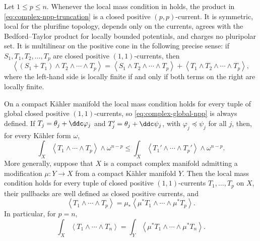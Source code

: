 \begin{theorem}\label{thm:complex-npp-ledger}
Let $1\leq p\leq n$.  Whenever the local mass condition in
 holds, the product in
\eqref{eq:complex-npp-truncation} is a closed positive $(p,p)$-current.
It is symmetric, local for the plurifine topology, depends only on the
currents, agrees with the Bedford--Taylor product for locally bounded
potentials, and charges no pluripolar set.  It is multilinear on the positive
cone in the following precise sense: if $S_1,T_1,T_2,\ldots,T_p$ are
closed positive $(1,1)$-currents, then
\[
 \left\langle (S_1+T_1)\wedge T_2\wedge\cdots\wedge T_p\right\rangle
 =\left\langle S_1\wedge T_2\wedge\cdots\wedge T_p\right\rangle
  +\left\langle T_1\wedge T_2\wedge\cdots\wedge T_p\right\rangle,
\]
where the left-hand side is locally finite if and only if both terms on the
right are locally finite.

On a compact K\"ahler manifold the local mass condition holds for every
tuple of global closed positive $(1,1)$-currents, so
\eqref{eq:complex-global-npp} is always defined.  If
$T_j=\theta_j+\ddc\varphi_j$ and
$T_j'=\theta_j+\ddc\psi_j$, with
$\varphi_j\preceq\psi_j$ for all $j$, then, for every K\"ahler form
$\omega$,
\[
 \int_X\left\langle T_1\wedge\cdots\wedge T_p\right\rangle
              \wedge\omega^{n-p}
 \leq
 \int_X\left\langle T_1'\wedge\cdots\wedge T_p'\right\rangle
              \wedge\omega^{n-p}.
\]
More generally, suppose that $X$ is a compact complex manifold admitting
a modification $\mu:Y\to X$ from a compact K\"ahler manifold $Y$.
Then the local mass condition holds for every tuple of closed positive
$(1,1)$-currents $T_1,\ldots,T_p$ on $X$, their pullbacks are
well defined as closed positive currents, and
\[
 \left\langle T_1\wedge\cdots\wedge T_p\right\rangle
 =\mu_*\left\langle
       \mu^*T_1\wedge\cdots\wedge\mu^*T_p\right\rangle .
\tag{51.16a}\label{eq:complex-npp-modification}
\]
In particular, for $p=n$,
\[
 \int_X\left\langle T_1\wedge\cdots\wedge T_n\right\rangle
 =\int_Y\left\langle
       \mu^*T_1\wedge\cdots\wedge\mu^*T_n\right\rangle .
\]
\end{theorem}

